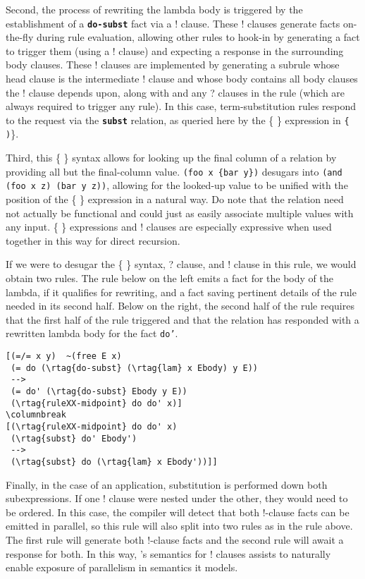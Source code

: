Second, the process of rewriting the lambda body is triggered by the establishment of a \textbf{\texttt{do-subst}} fact via a ! clause. These ! clauses generate facts on-the-fly during rule evaluation, allowing other rules to hook-in by generating a fact to trigger them (using a ! clause) and expecting a response in the surrounding body clauses. These ! clauses are implemented by generating a subrule whose head clause is the intermediate ! clause and whose body contains all body clauses the ! clause depends upon, along with and any ? clauses in the rule (which are always required to trigger any rule). In this case, term-substitution rules respond to the  request via the \textbf{\texttt{subst}} relation, as queried here by the \{ \!\} expression in \texttt{\{ )}\}.

Third, this \{ \!\} syntax allows for looking up the final column of a relation by providing all but the final-column value. \texttt{(foo x \{bar y\})} desugars into \texttt{(and (foo x z) (bar y z))}, allowing for the looked-up value to be unified with the position of the \{ \!\} expression in a natural way. Do note that the relation need not actually be functional and could just as easily associate multiple values with any input.
%
\{ \!\} expressions and ! clauses are especially expressive when used together in this way for direct recursion.

If we were to desugar the \{ \!\} syntax, ? clause, and ! clause in this rule, we would obtain two rules.
%
The rule below on the left emits a  fact for the body of the lambda, if it qualifies for rewriting, and a  fact saving pertinent details of the rule needed in its second half. Below on the right, the second half of the rule requires that the first half of the rule triggered and that the  relation has responded with a rewritten lambda body for the  fact \texttt{do'}.
%
\begin{multicols}{2}
\begin{Verbatim}[baselinestretch=0.8,commandchars=\\\{\}]
[(=/= x y)  ~(free E x)
 (= do (\rtag{do-subst} (\rtag{lam} x Ebody) y E)) 
 -->
 (= do' (\rtag{do-subst} Ebody y E)) 
 (\rtag{ruleXX-midpoint} do do' x)]
\columnbreak
[(\rtag{ruleXX-midpoint} do do' x)
 (\rtag{subst} do' Ebody')
 --> 
 (\rtag{subst} do (\rtag{lam} x Ebody'))]]
\end{Verbatim}
\end{multicols}
%
Finally, in the case of an application, substitution is performed down both subexpressions.
%
If one ! clause were nested under the other, they would need to be ordered. In this case, the compiler will detect that both !-clause facts can be emitted in parallel, so this rule will also split into two rules as in the rule above. The first rule will generate both !-clause facts and the second rule will await a response for both.
%
In this way, \slog{}'s semantics for ! clauses assists to naturally enable exposure of parallelism in semantics it models.


